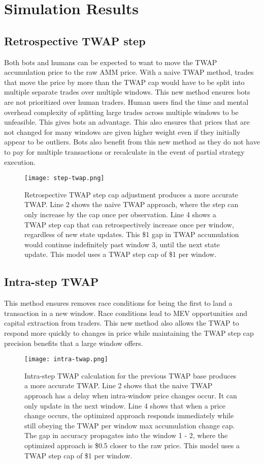 \documentclass{article}
\begin{document}
\section{Simulation Results}

\subsection{Retrospective TWAP step}
Both bots and humans can be expected to want to move the TWAP accumulation price to the raw AMM price. With a naive TWAP method, trades that move the price by more than the TWAP cap would have to be split into multiple separate trades over multiple windows. This new method ensures bots are not prioritized over human traders. Human users find the time and mental overhead complexity of splitting large trades across multiple windows to be unfeasible. This gives bots an advantage. This also ensures that prices that are not changed for many windows are given higher weight even if they initially appear to be outliers. Bots also benefit from this new method as they do not have to pay for multiple transactions or recalculate in the event of partial strategy execution.

\begin{figure}[H]
    \centering
    \texttt{[image: step-twap.png]}
    \caption{Retrospective TWAP step cap adjustment produces a more accurate TWAP. Line 2 shows the naive TWAP approach, where the step can only increase by the cap once per observation. Line 4 shows a TWAP step cap that can retrospectively increase once per window, regardless of new state updates. This \$1 gap in TWAP accumulation would continue indefinitely past window 3, until the next state update. This model uses a TWAP step cap of \$1 per window.}
    \label{fig:enter-label}
\end{figure}

\subsection{Intra-step TWAP}
This method ensures removes race conditions for being the first to land a transaction in a new window. Race conditions lead to MEV opportunities and capital extraction from traders. This new method also allows the TWAP to respond more quickly to changes in price while maintaining the TWAP step cap precision benefits that a large window offers.

\begin{figure}[H]
    \centering
    \texttt{[image: intra-twap.png]}
    \caption{Intra-step TWAP calculation for the previous TWAP base produces a more accurate TWAP. Line 2 shows that the naive TWAP approach has a delay when intra-window price changes occur. It can only update in the next window. Line 4 shows that when a price change occurs, the optimized approach responds immediately while still obeying the TWAP per window max accumulation change cap. The gap in accuracy propagates into the window 1 - 2, where the optimized approach is \$0.5 closer to the raw price. This model uses a TWAP step cap of \$1 per window.}
    \label{fig:enter-label}
\end{figure}
\end{document}
